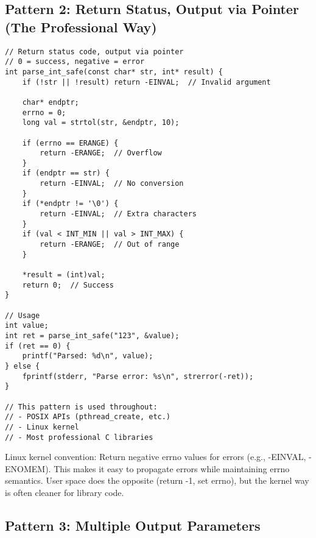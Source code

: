 \subsection{Pattern 2: Return Status, Output via Pointer (The Professional Way)}

\begin{lstlisting}
// Return status code, output via pointer
// 0 = success, negative = error
int parse_int_safe(const char* str, int* result) {
    if (!str || !result) return -EINVAL;  // Invalid argument

    char* endptr;
    errno = 0;
    long val = strtol(str, &endptr, 10);

    if (errno == ERANGE) {
        return -ERANGE;  // Overflow
    }
    if (endptr == str) {
        return -EINVAL;  // No conversion
    }
    if (*endptr != '\0') {
        return -EINVAL;  // Extra characters
    }
    if (val < INT_MIN || val > INT_MAX) {
        return -ERANGE;  // Out of range
    }

    *result = (int)val;
    return 0;  // Success
}

// Usage
int value;
int ret = parse_int_safe("123", &value);
if (ret == 0) {
    printf("Parsed: %d\n", value);
} else {
    fprintf(stderr, "Parse error: %s\n", strerror(-ret));
}

// This pattern is used throughout:
// - POSIX APIs (pthread_create, etc.)
// - Linux kernel
// - Most professional C libraries
\end{lstlisting}

\begin{tipbox}
Linux kernel convention: Return negative errno values for errors (e.g., -EINVAL, -ENOMEM). This makes it easy to propagate errors while maintaining errno semantics. User space does the opposite (return -1, set errno), but the kernel way is often cleaner for library code.
\end{tipbox}

\subsection{Pattern 3: Multiple Output Parameters}

